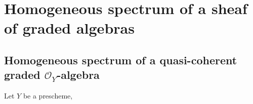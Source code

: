 \section{Homogeneous spectrum of a sheaf of graded algebras}
\label{section:II.3}


\subsection{Homogeneous spectrum of a quasi-coherent graded $\mathcal{O}_Y$-algebra}
\label{subsection:II.3.1}

\begin{env}[3.1.1]
\label{II.3.1.1}
Let $Y$ be a prescheme,
\end{env}














